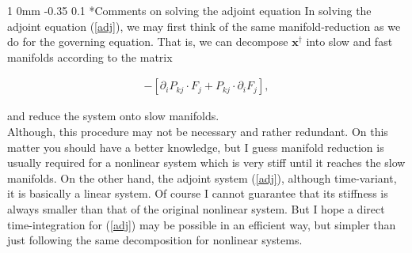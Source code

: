 \documentclass[11pt]{article}
\makeatletter
\renewcommand{\subsection}{\@startsection
{subsection}%
{1}%
{0mm}%
{-0.35\baselineskip}%
{0.1\baselineskip}%
{\normalfont\large\bfseries\color{brown}}}%
\newcommand\eqsp[2]{
\begin{equation#1}
\begin{split}
#2
\end{split}
\end{equation#1}
}
\newcommand{\bx}{\mathbf{x}}
\makeatother
\begin{document}
\subsection*{Comments on solving the adjoint equation}
In solving the adjoint equation (\ref{adj}), we may first think of the same manifold-reduction as we do for the governing equation.
That is, we can decompose $\bx^{\dagger}$ into slow and fast manifolds according to the matrix
\eqsp{*}{
- \left[ \partial_iP_{kj}\cdot F_j + P_{kj}\cdot\partial_iF_j \right],
}
and reduce the system onto slow manifolds.\\
Although, this procedure may not be necessary and rather redundant.
On this matter you should have a better knowledge,
but I guess manifold reduction is usually required for a nonlinear system which is very stiff until it reaches the slow manifolds.
On the other hand, the adjoint system (\ref{adj}), although time-variant,
it is basically a linear system.
Of course I cannot guarantee that its stiffness is always smaller than that of the original nonlinear system.
But I hope a direct time-integration for (\ref{adj}) may be possible in an efficient way,
but simpler than just following the same decomposition for nonlinear systems.
\end{document}
